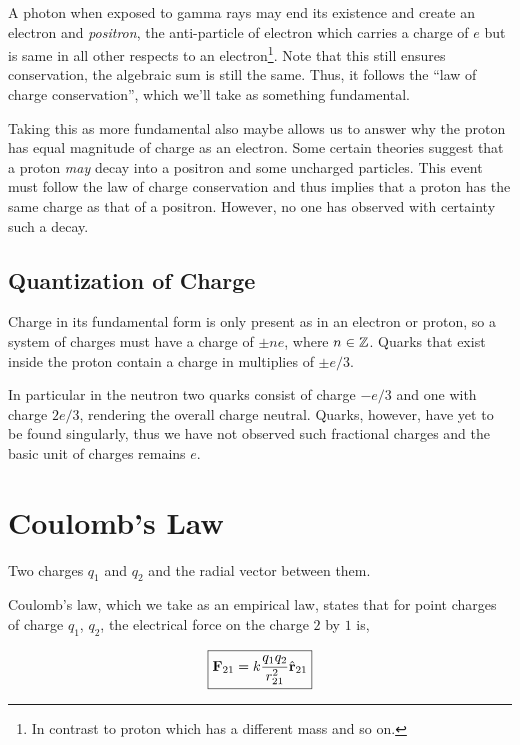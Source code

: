A photon when exposed to gamma rays may end its existence and create an electron 
and \emph{positron}, the anti-particle of electron which carries a charge of \(e\) but 
is same in all other respects to an electron\footnote{In contrast to proton 
which has a different mass and so on.}. Note that this still ensures conservation,
the algebraic sum is still the same. Thus, it follows the ``law of charge 
conservation'', which we'll take as something fundamental.

Taking this as more fundamental also maybe allows us to answer 
why the proton has equal magnitude of charge as an electron. Some 
certain theories suggest that a proton \emph{may} decay into a positron
and some uncharged particles. This event must follow the law of charge 
conservation and thus implies that a proton has the same charge as that of 
a positron.
However, no one has observed with certainty such a decay.

\subsection{Quantization of Charge}

Charge in its fundamental form is only present as in an electron or proton, 
so a system of charges must have a charge of \(\pm ne\), where \(n \in \mathbb Z\).
Quarks that exist inside the proton contain a charge in multiplies of \(\pm e/3\).

In particular in the neutron two quarks consist of charge \(-e/3\) and one with 
charge \(2e/3\), rendering the overall charge neutral. 
Quarks, however, have yet to be found singularly, thus we have not observed such fractional charges
and the basic unit of charges remains \(e\). 

\section{Coulomb's Law}

\begin{marginfigure}
    \centering
    \caption{Two charges \(q_1\) and \(q_2\) and the 
    radial vector between them.}
\end{marginfigure}

Coulomb's law, which we take as an empirical law, states that 
for point charges of charge \(q_1\), \(q_2\), the electrical force 
on the charge \(2\) by \(1\) is,

\begin{equation}
    \label{coloumb force}
    \boxed{\boldsymbol{\mathbf{F}}_{21} = k\frac{q_1q_2}{r_{21}^2}\hat{\boldsymbol{\mathbf{r}}}_{21}}
\end{equation}

